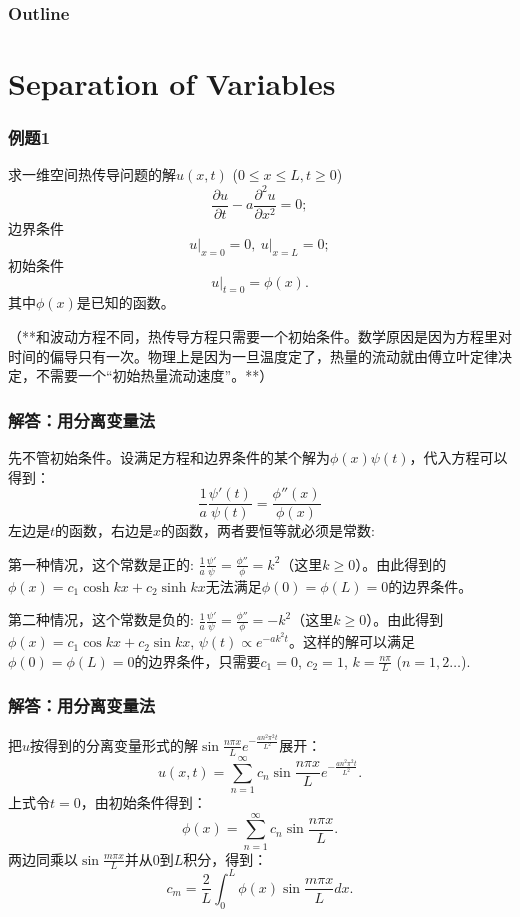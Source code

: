 \documentclass[CJK]{beamer}
\date{}
\begin{document}
  \bch
{}


\begin{frame}
  \frametitle{Outline}
  \tableofcontents
\end{frame}

\section{Separation of Variables}



\begin{frame}
  \frametitle{例题1}
  求一维空间热传导问题的解$u(x,t)$ ($0\le x\le L, t\ge 0$)
  $$ \frac{\partial u}{\partial t} - a\frac{\partial^2u}{\partial x^2} = 0;$$
  边界条件
  $$ \left.u\right\vert_{x=0} = 0,\ \left.u\right\vert_{x=L}=0; $$
  初始条件
  $$ \left.u\right\vert_{t=0} = \phi(x). $$
  其中$\phi(x)$是已知的函数。

  \skiplines
  {\scriptsize （**和波动方程不同，热传导方程只需要一个初始条件。数学原因是因为方程里对时间的偏导只有一次。物理上是因为一旦温度定了，热量的流动就由傅立叶定律决定，不需要一个“初始热量流动速度”。**）}
\end{frame}  


\begin{frame}
  \frametitle{解答：用分离变量法}
  先不管初始条件。设满足方程和边界条件的某个解为$\phi(x)\psi(t)$，代入方程可以得到：
  $$\frac{1}{a}\frac{\psi'(t)}{\psi(t)} = \frac{\phi''(x)}{\phi(x)} $$
  左边是$t$的函数，右边是$x$的函数，两者要恒等就必须是常数:
  \bitem
\item{第一种情况，这个常数是正的: $\frac{1}{a}\frac{\psi'}{\psi} = \frac{\phi''}{\phi} = k^2$（这里$k\ge 0$）。由此得到的$\phi(x) = c_1\cosh{kx}+c_2\sinh{kx}$无法满足$\phi(0)=\phi(L)=0$的边界条件。}
\item{第二种情况，这个常数是负的: $\frac{1}{a}\frac{\psi'}{\psi} = \frac{\phi''}{\phi} = -k^2$（这里$k\ge 0$）。由此得到$\phi(x) = c_1\cos{kx} + c_2\sin{kx}$, $\psi(t) \propto e^{-ak^2t}$。这样的解可以满足$\phi(0)=\phi(L)=0$的边界条件，只需要$c_1 = 0$, $c_2=1$, $k=\frac{n\pi}{L}$ ($n=1,2\ldots $).}
  \eitem
  
\end{frame}


\begin{frame}
  \frametitle{解答：用分离变量法}
  把$u$按得到的分离变量形式的解$\sin\frac{n\pi x}{L}e^{-\frac{an^2\pi^2t}{L^2}}$展开：
  $$ u(x,t) = \sum_{n=1}^\infty c_n  \sin\frac{n\pi x}{L}e^{-\frac{an^2\pi^2t}{L^2}} .$$
  上式令$t=0$，由初始条件得到：
  $$\phi(x) = \sum_{n=1}^\infty c_n \sin\frac{n\pi x}{L}. $$
  两边同乘以$\sin\frac{m\pi x}{L}$并从$0$到$L$积分，得到：
  $$ c_m = \frac{2}{L}\int_0^L \phi(x)\sin\frac{m\pi x}{L} dx . $$
\end{frame}
\end{document}
